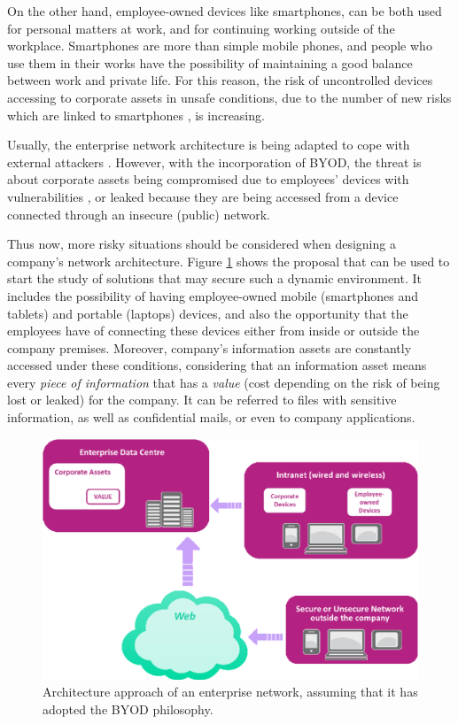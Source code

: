 On the other hand, employee-owned devices like smartphones, can be both used for personal matters at work, and for continuing working outside of the workplace. Smartphones are more than simple mobile phones, and people who use them in their works have the possibility of maintaining a good balance between work and private life. For this reason, the risk of uncontrolled devices accessing to corporate assets in unsafe conditions, due to the number of new risks which are linked to smartphones \cite{gangula2013survey}, is increasing.

Usually, the enterprise network architecture is being adapted to cope with external attackers \cite{MIT05}. However, with the incorporation of BYOD, the threat is about corporate assets being compromised due to employees' devices with vulnerabilities \cite{android11}, or leaked because they are being accessed from a device connected through an insecure (public) network.

Thus now, more risky situations should be considered when designing a company's network architecture. Figure \ref{fig:proposed_diagram} shows the proposal that can be used to start the study of solutions that may secure such a dynamic environment. It includes the possibility of having employee-owned mobile (smartphones and tablets) and portable (laptops) devices, and also the opportunity that the employees have of connecting these devices either from inside or outside the company premises. Moreover, company's information assets are constantly accessed under these conditions, considering that an information asset means every \textit{piece of information} that has a \textit{value} (cost depending on the risk of being lost or leaked) for the company. It can be referred to files with sensitive information, as well as confidential mails, or even to company applications.

\begin{figure}
\centering
	\includegraphics[scale =0.4] {gfx/byodSotA/proposedDiagram.pdf}
	\caption{Architecture approach of an enterprise network, assuming that it has adopted the BYOD philosophy.}
	\label{fig:proposed_diagram}
\end{figure}


